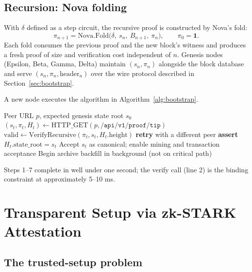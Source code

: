 \documentclass[11pt,a4paper]{article}
\begin{document}
\subsection{Recursion: Nova folding}

With $\delta$ defined as a step circuit, the recursive proof is
constructed by Nova's fold:
\[
  \pi_{n+1} = \mathrm{Nova.Fold}\big(\delta,\ s_n,\ B_{n+1},\ \pi_n\big),
  \qquad \pi_0 = \mathbf{1}.
\]
Each fold consumes the previous proof and the new block's witness and
produces a fresh proof of size and verification cost independent of $n$.
Genesis nodes (Epsilon, Beta, Gamma, Delta) maintain
$(s_n, \pi_n)$ alongside the block database and serve
$(s_n, \pi_n, \mathrm{header}_n)$ over the wire protocol described in
Section~\ref{sec:bootstrap}.

A new node executes the algorithm in Algorithm~\ref{alg:bootstrap}.

\begin{algorithm}[t]
\caption{Proof-bootstrap of a fresh node}
\label{alg:bootstrap}
\begin{algorithmic}[1]
\Require Peer URL $p$, expected genesis state root $s_0$
\State $(s_t, \pi_t, H_t) \gets \mathrm{HTTP\_GET}(p, \mathtt{/api/v1/proof/tip})$
\State $\mathrm{valid} \gets \mathrm{VerifyRecursive}(\pi_t, s_t, H_t.\mathrm{height})$
  \State \textbf{retry} with a different peer
\EndIf
\State \textbf{assert} $H_t.\mathrm{state\_root} = s_t$
\State Accept $s_t$ as canonical; enable mining and transaction acceptance
\State Begin archive backfill in background (not on critical path)
\end{algorithmic}
\end{algorithm}

Steps 1--7 complete in well under one second; the verify call (line 2)
is the binding constraint at approximately 5--10 ms.

\section{Transparent Setup via zk-STARK Attestation}
\label{sec:stark-setup}

\subsection{The trusted-setup problem}
\end{document}
